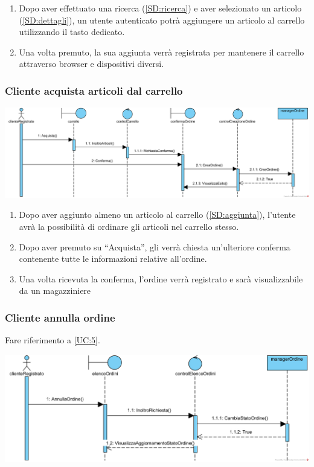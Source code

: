 \documentclass[12pt,a4paper]{article}
\begin{document}
\begin{enumerate}
\item Dopo aver effettuato una ricerca (\ref{SD:ricerca}) e aver selezionato un articolo (\ref{SD:dettagli}), un utente autenticato potrà aggiungere un articolo al carrello utilizzando il tasto dedicato.
\item Una volta premuto, la sua aggiunta verrà registrata per mantenere il carrello attraverso browser e dispositivi diversi.
\end{enumerate}

\newpage

\subsubsection{Cliente acquista articoli dal carrello}
\label{SD:acquista}

\begin{center}
\includegraphics[width=\textwidth]{SequenceDiagram/ClienteAcquistaArticolo}
\end{center}

\begin{enumerate}
\item Dopo aver aggiunto almeno un articolo al carrello (\ref{SD:aggiunta}), l'utente avrà la possibilità di ordinare gli articoli nel carrello stesso.
\item Dopo aver premuto su ``Acquista'', gli verrà chiesta un'ulteriore conferma contenente tutte le informazioni relative all'ordine.
\item Una volta ricevuta la conferma, l'ordine verrà registrato e sarà visualizzabile da un magazziniere %
\end{enumerate}

\subsubsection{Cliente annulla ordine}
\label{SD:annull}

Fare riferimento a \ref{UC:5}. \\

\begin{center}
\includegraphics[width=\textwidth]{SequenceDiagram/ClienteAnnullaOrdine}
\end{center}
\end{document}
